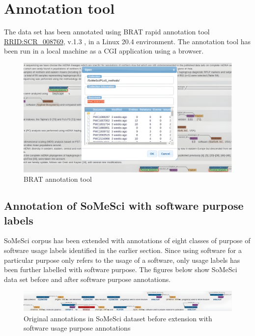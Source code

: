 \section{Annotation tool}
\label{sec:dataset:tool}
The data set has been annotated using BRAT rapid annotation tool \href{https://scicrunch.org/resolver/SCR_008769}{RRID:SCR\_008769}, v.1.3 , in a Linux 20.4 environment. The annotation tool has been run in a local machine as a CGI application using a browser. 

\begin{figure}[htbp]
	\centering
	\includegraphics[width=.75\textwidth]{4.graphics/figures/ch_4/BRAT_tool}
	\caption{BRAT annotation tool}
	\label{fig:chapter04:setup}
\end{figure}

\subsection{Annotation of SoMeSci with software purpose labels}
\label{subsec:dataset:tool:Annotationprocess}

\ac{SoMeSci} corpus has been extended with annotations of eight classes of purpose of software usage labels identified in the earlier section. Since using software for a particular purpose only refers to the usage of a software, only usage labels has been further labelled with software purpose. The figures below show \ac{SoMeSci} data set before and after software purpose annotations. \\

\begin{figure}[htbp]
	\centering
	\includegraphics[width=.99\textwidth]{4.graphics/figures/ch_4/before_ann_hd_PMC3120364_FULLTEX_HD}
	\caption{Original annotations in \ac{SoMeSci} dataset before extension with software usage purpose annotations }
	\label{fig:chapter04:setup}
\end{figure}

